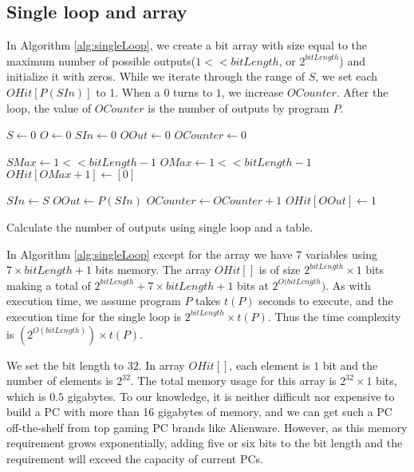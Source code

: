 \subsection{Single loop and array}
In Algorithm \ref{alg:singleLoop}, we create a bit array with size equal to the maximum number of possible outputs($1 << bitLength$, or $2^{bitLength}$) and initialize it with zeros. While we iterate through the range of $S$, we set each $OHit[P(SIn)]$ to $1$. When a $0$ turns to $1$, we increase $OCounter$. After the loop, the value of $OCounter$ is the number of outputs by program $P$. 

\renewcommand{\algorithmiccomment}[1]{// #1}
\begin{algorithm}
\begin{algorithmic}

\STATE $S \leftarrow 0$
\STATE $O \leftarrow 0$
\STATE $SIn \leftarrow 0$
\STATE $OOut \leftarrow 0$
\STATE $OCounter \leftarrow 0$

\STATE $SMax \leftarrow 1 << bitLength - 1$
\STATE $OMax \leftarrow 1 << bitLength - 1$
\STATE $OHit[OMax + 1] \leftarrow [0]$

\STATE $SIn \leftarrow S$ 
\STATE $OOut \leftarrow P(SIn)$ 
\STATE $OCounter \leftarrow OCounter + 1$
\STATE $OHit[OOut] \leftarrow 1$
\ENDIF
\ENDFOR

\end{algorithmic}

\caption[Single loop]{Calculate the number of outputs using single loop and a table.}
\label{alg:singleLoop}
\end{algorithm}

In Algorithm \ref{alg:singleLoop} except for the array we have 7 variables using $7 \times bitLength + 1$ bits memory. The array $OHit[]$ is of size $2^{bitLength} \times 1$ bits making a total of $2^{bitLength} + 7 \times bitLength + 1$ bits at $2^{O(bitLength})$. As with execution time, we assume program $P$ takes $t(P)$ seconds to execute, and the execution time for the single loop is $2^{bitLength} \times t(P)$. Thus the time complexity is $(2^{O(bitLength)}) \times t(P)$.

We set the bit length to $32$. In array $OHit[]$, each element is $1$ bit and the number of elements is $2^{32}$. The total memory usage for this array is $2^{32} \times 1$ bits, which is $0.5$ gigabytes. To our knowledge, it is neither difficult nor expensive to build a PC with more than 16 gigabytes of memory, and we can get such a PC off-the-shelf from top gaming PC brands like Alienware. However, as this memory requirement grows exponentially, adding five or six bits to the bit length and the requirement will exceed the capacity of current PCs.

